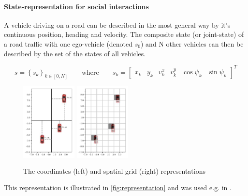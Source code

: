 \documentclass{article}
\begin{document}
\paragraph{State-representation for social interactions}{

A vehicle driving on a road can be described in the most general way by it's continuous position, heading and velocity. The composite state (or joint-state) of a road traffic with one ego-vehicle (denoted $s_0$) and N other vehicles can then be described by the set of the states of all vehicles.

\begin{equation*}
s = \left\lbrace s_k \right\rbrace_{k \in [0, N]}\qquad
\text{where}\qquad
s_k = \begin{bmatrix}
x_k & y_k & v^x_k & v^y_k & \cos\psi_k & \sin \psi_k
\end{bmatrix}^T
\end{equation*}


\begin{figure}[tp]
	\centering
	\includegraphics[width=0.25\textwidth]{img/coordinates}
	\includegraphics[width=0.25\textwidth]{img/map}
	\caption{The coordinates (left) and spatial-grid (right) representations}
	\label{fig:representation}
\end{figure}

This representation is illustrated in \autoref{fig:representation} and was used e.g. in \citep{Bai2015, Gindele2015, Song2016, Sunberg2017, Paxton2017, Galceran2017, Chen2017}.


}
\end{document}
